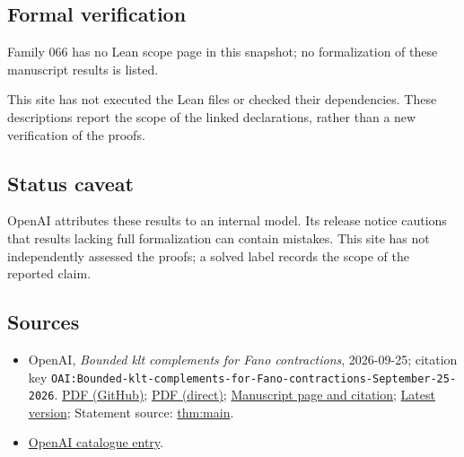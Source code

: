 \documentclass[11pt]{article}
\begin{document}
\subsection{Formal verification}
Family 066 has no Lean scope page in this snapshot; no formalization of these manuscript results is listed.

This site has not executed the Lean files or checked their dependencies. These descriptions report the scope of the linked declarations, rather than a new verification of the proofs.

\subsection{Status caveat}
OpenAI attributes these results to an internal model. Its release notice cautions that results lacking full formalization can contain mistakes. This site has not independently assessed the proofs; a solved label records the scope of the reported claim.

\subsection{Sources}
\begin{itemize}
\item OpenAI, \emph{Bounded klt complements for Fano contractions}, 2026-09-25; citation key \texttt{OAI:Bounded-klt-complements-for-Fano-contractions-September-25-2026}. \href{https://github.com/openai/math/blob/adc7f1241b42e322a6451854ab7e4b4c146bf78a/preprints/Bounded-klt-complements-for-Fano-contractions-September-25-2026/Bounded-klt-complements-for-Fano-contractions-September-25-2026.pdf}{PDF (GitHub)}; \href{https://github.com/openai/math/raw/adc7f1241b42e322a6451854ab7e4b4c146bf78a/preprints/Bounded-klt-complements-for-Fano-contractions-September-25-2026/Bounded-klt-complements-for-Fano-contractions-September-25-2026.pdf}{PDF (direct)}; \href{https://github.com/openai/math/blob/adc7f1241b42e322a6451854ab7e4b4c146bf78a/preprints/Bounded-klt-complements-for-Fano-contractions-September-25-2026/README.md}{Manuscript page and citation}; \href{https://github.com/openai/math/blob/main/preprints/Bounded-klt-complements-for-Fano-contractions-September-25-2026/Bounded-klt-complements-for-Fano-contractions-September-25-2026.pdf}{Latest version}; Statement source: \href{https://github.com/openai/math/blob/adc7f1241b42e322a6451854ab7e4b4c146bf78a/preprints/Bounded-klt-complements-for-Fano-contractions-September-25-2026/build/sections/introduction.tex\#L22}{thm:main}.
\item \href{https://github.com/openai/math/blob/adc7f1241b42e322a6451854ab7e4b4c146bf78a/CONTENTS.md}{OpenAI catalogue entry}.
\end{itemize}
\end{document}
